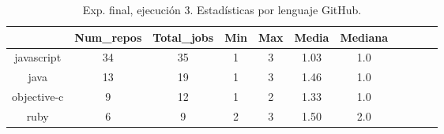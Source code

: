 \begin{table}[h]
  \centering
  \caption{Exp. final, ejecución 3. Estadísticas por lenguaje GitHub.}
  \label{tab:tabla_f_3_3}

\begin{footnotesize}
\renewcommand{\arraystretch}{1.5} %
\begin{tabular}{ccccccccccc}
  \hline
  {} &  Num\_repos &  Total\_jobs &  Min &  Max &  Media &  Mediana \\
  \hline
  javascript   &         34 &          35 &    1 &    3 &   1.03 &      1.0 \\
  java         &         13 &          19 &    1 &    3 &   1.46 &      1.0 \\
  objective-c  &          9 &          12 &    1 &    2 &   1.33 &      1.0 \\
  ruby         &          6 &           9 &    2 &    3 &   1.50 &      2.0 \\
 \end{tabular}
\end{footnotesize}

\end{table}

